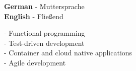 \documentclass[9pt]{../developercv} %
\begin{document}
\begin{minipage}[t]{0.45\textwidth}
	\vspace{-\baselineskip} %

	
	\textbf{German} - Muttersprache\\
	\textbf{English} - Fließend
\end{minipage}
\hfill
\begin{minipage}[t]{0.45\textwidth}
	\vspace{-\baselineskip} %
	
	
        - Functional programming\\
        - Test-driven development\\
        - Container and cloud native applications\\
        - Agile development\\
\end{minipage}

\end{document}
